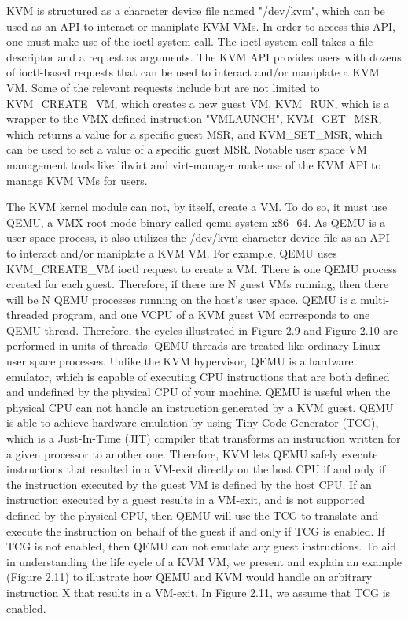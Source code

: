 \documentclass{report}
\begin{document}
\begin{spacing}{1.5}
{\large
\noindent KVM is structured as a character device file named "/dev/kvm", which can be used as an API to interact or maniplate KVM VMs. In order to access this API, one must make use of the ioctl system call. The ioctl system call takes a file descriptor and a request as arguments. The KVM API provides users with dozens of ioctl-based requests that can be used to interact and/or maniplate a KVM VM. Some of the relevant requests include but are not limited to KVM\_CREATE\_VM, which creates a new guest VM, KVM\_RUN, which is a wrapper to the VMX defined instruction "VMLAUNCH", KVM\_GET\_MSR, which returns a value for a specific guest MSR, and KVM\_SET\_MSR, which can be used to set a value of a specific guest MSR. Notable user space VM management tools like libvirt and virt-manager make use of the KVM API to manage KVM VMs for users.
\newline
}


{\large
\noindent The KVM kernel module can not, by itself, create a VM. To do so, it must use QEMU, a VMX root mode binary called qemu-system-x86\_64. As QEMU is a user space process, it also utilizes the /dev/kvm character device file as an API to interact and/or maniplate a KVM VM. For example, QEMU uses KVM\_CREATE\_VM ioctl request to create a VM. There is one QEMU process created for each guest. Therefore, if there are N guest VMs running, then there will be N QEMU processes running on the host's user space. QEMU is a multi-threaded program, and one VCPU of a KVM guest VM corresponds to one QEMU thread. Therefore, the cycles illustrated in Figure 2.9 and Figure 2.10 are performed in units of threads. QEMU threads are treated like ordinary Linux user space processes. Unlike the KVM hypervisor, QEMU is a hardware emulator, which is capable of executing CPU instructions that are both defined and undefined by the physical CPU of your machine. QEMU is useful when the physical CPU can not handle an instruction generated by a KVM guest. QEMU is able to achieve hardware emulation by using Tiny Code Generator (TCG), which is a Just-In-Time (JIT) compiler that transforms an instruction written for a given processor to another one. Therefore, KVM lets QEMU safely execute instructions that resulted in a VM-exit directly on the host CPU if and only if the instruction executed by the guest VM is defined by the host CPU. If an instruction executed by a guest results in a VM-exit, and is not supported defined by the physical CPU, then QEMU will use the TCG to translate and execute the instruction on behalf of the guest if and only if TCG is enabled. If TCG is not enabled, then QEMU can not emulate any guest instructions. To aid in understanding the life cycle of a KVM VM, we present and explain an example (Figure 2.11) to illustrate how QEMU and KVM would handle an arbitrary instruction X that results in a VM-exit. In Figure 2.11, we assume that TCG is enabled.
\newline
}


\end{spacing}
\end{document}
